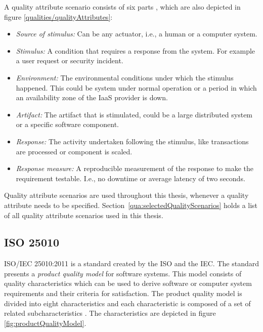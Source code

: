 A quality attribute scenario consists of six parts \citep[p. 68]{Bass2012}, which are also depicted in figure \ref{qualities/qualityAttributes}:
\begin{itemize}
	\item \textit{Source of stimulus:} Can be any actuator, i.e., a human or a computer system.
	\item \textit{Stimulus:} A condition that requires a response from the system. For example a user request or security incident.
	\item \textit{Environment:} The environmental conditions under which the stimulus happened. This could be system under normal operation or a period in which an availability zone of the \ac{IaaS} provider is down.
	\item \textit{Artifact:} The artifact that is stimulated, could be a large distributed system or a specific software component.
	\item \textit{Response:} The activity undertaken following the stimulus, like transactions are processed or component is scaled.
	\item \textit{Response measure:} A reproducible measurement of the response to make the requirement testable. I.e., no downtime or average latency of two seconds.
\end{itemize}



Quality attribute scenarios are used throughout this thesis, whenever a quality attribute needs to be specified.
Section~\ref{qua:selectedQualityScenarios} holds a list of all quality attribute scenarios used in this thesis.

\subsection{ISO 25010}
\label{qua:ISO}
ISO/IEC 25010:2011 is a standard created by the \ac{ISO} and the \ac{IEC}. 
The standard presents a \textit{product quality model} for software systems.
This model consists of quality characteristics which can be used to derive software or computer system requirements and their criteria for satisfaction.
The product quality model is divided into eight characteristics and each characteristic is composed of a set of related subcharacteristics \cite{ISO25010}. The characteristics are depicted in figure \ref{fig:productQualityModel}.


